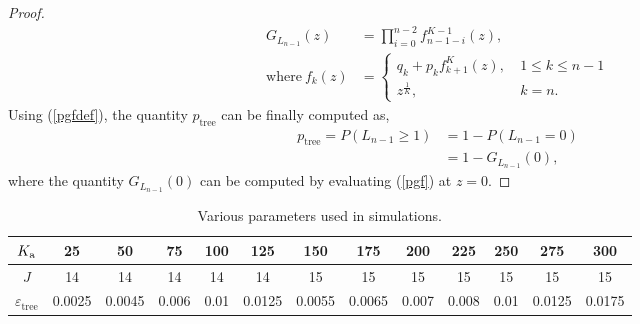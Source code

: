 \documentclass{article}
\begin{document}
\begin{proof}
\begin{align*}
G_{L_{n-1}}(z) &= \prod_{i=0}^{n-2} f_{n-1-i}^{K-1}(z), \\
\text{where}~ f_k(z) &= \begin{cases}
    q_k + p_k f_{k+1}^{K}(z),& ~1 \le k \le n-1 \\
    z^{\frac{1}{K}},              & ~k=n.
\end{cases}
\end{align*}
Using (\ref{pgfdef}), the quantity $p_{\text{tree}}$ can be finally computed as,
\begin{align}
p_{\text{tree}}=P(L_{n-1} \ge 1) &= 1 - P(L_{n-1} = 0)  \nonumber \\
&= 1 - G_{L_{n-1}}(0), \label{pgfprob}
\end{align}
where the quantity $G_{L_{n-1}}(0)$ can be computed by evaluating (\ref{pgf}) at $z=0$.
\end{proof}
\fi

\begin{table*}[!tbh]
\centering
 \begin{tabular}{||c|| c| c| c| c| c| c| c| c| c| c| c| c||}
 \hline
$K_\mathrm{a}$ & 25 & 50 & 75 & 100 & 125 & 150 & 175 & 200 & 225 & 250 & 275 & 300 \\[0.4ex]
 \hline
 $J$ & 14 & 14 & 14 & 14 & 14 & 15 & 15 & 15 & 15 & 15 & 15 & 15 \\[0.4ex]
 \hline
$\varepsilon_{\text{tree}}$ &0.0025 & 0.0045 & 0.006 & 0.01 & 0.0125 & 0.0055 & 0.0065 & 0.007 & 0.008 & 0.01 & 0.0125 & 0.0175 \\[0.4ex]
 \hline
\end{tabular}
\caption{Various parameters used in simulations.}
 \label{tableofparams}
\end{table*}
\end{document}
